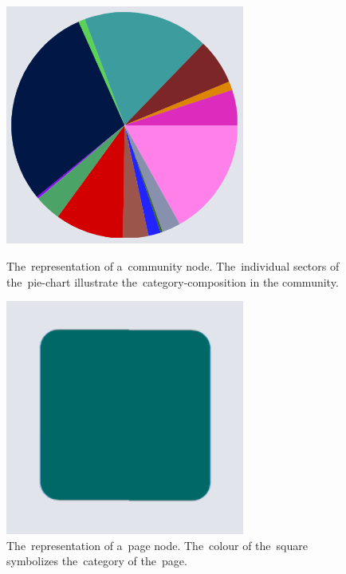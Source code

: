 \begin{figure} 
  \begin{minipage}[t]{0.475\textwidth}
    \centering
    \includegraphics[width=0.7\textwidth]{Images/community_node.png}
    \caption{The~representation of a~community node. The~individual sectors of the~pie-chart illustrate the~category-composition in the community.}
    \label{communityNodeRepresentation}
  \end{minipage} \hfill
  \begin{minipage}[t]{0.475\textwidth}
    \centering
    \includegraphics[width=0.7\textwidth]{Images/page_node.png}
    \caption{The~representation of a~page node. The~colour of the~square symbolizes the~category of the~page.}
    \label{pageNodeRepresentation}
  \end{minipage} 
\end{figure} 
